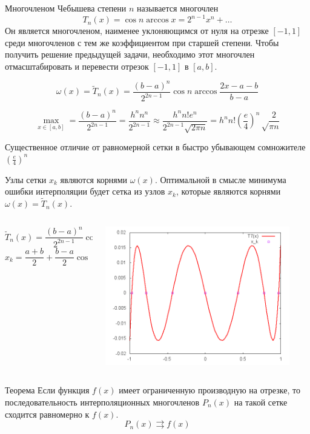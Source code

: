 \documentclass[professionalfonts,compress,unicode]{beamer}
\begin{document}
{
	Многочленом Чебышева степени $n$ называется многочлен
	$$
	T_n(x) = \cos n \arccos x = 2^{n-1} x^n + \dots
	$$
	Он является многочленом, наименее уклоняющимся от нуля на отрезке $[-1,1]$ среди многочленов с тем же коэффициентом при старшей степени.
	Чтобы получить решение предыдущей задачи, необходимо этот многочлен отмасштабировать и перевести отрезок $[-1,1]$ в $[a,b]$.
	\pause
	
	$$
	\omega(x) = \tilde{T}_n(x) = \frac{(b-a)^n}{2^{2n-1}} \cos n \arccos \frac{2x-a-b}{b-a}
	$$
	
	\pause
	$$
	\max_{x\in[a,b]} = \frac{(b-a)^n}{2^{2n-1}} = \frac{h^n n^n}{2^{2n-1}} \approx \frac{h^n n! e^n}{2^{2n-1}\sqrt{2\pi n}} =
	h^n n! \left(\frac{e}{4}\right)^n \sqrt\frac{2}{\pi n}
	$$
	
	Существенное отличие от равномерной сетки в быстро убывающем сомножителе $\left(\frac{e}{4}\right)^n$
}

{
	Узлы сетки $x_k$ являются корнями $\omega(x)$. Оптимальной в смысле минимума ошибки интерполяции будет
	сетка из узлов $x_k$, которые являются корнями $\omega(x) = \tilde{T}_n(x)$.
	\pause
	\begin{columns}[T]
	\begin{column}{0.6\textwidth}
	$$
	\tilde{T}_n(x) = \frac{(b-a)^n}{2^{2n-1}} \cos n \arccos \frac{2x-a-b}{b-a}
	$$
	$$
	x_k = \frac{a+b}{2} + \frac{b-a}{2} \cos \left(\frac{2k-1}{2n}\pi\right)
	$$
	\end{column}
	\begin{column}{0.4\textwidth}
	\includegraphics[width=0.9\textwidth]{cheb.png}
	\end{column}
	\end{columns}
	\pause
	
	\begin{block}{Теорема}
		Если функция $f(x)$ имеет ограниченную производную на отрезке, то последовательность 
		интерполяционных многочленов $P_n(x)$ на такой сетке сходится равномерно к $f(x)$.
		$$
		P_n(x) \rightrightarrows f(x)
		$$
	\end{block}
}
\end{document}
